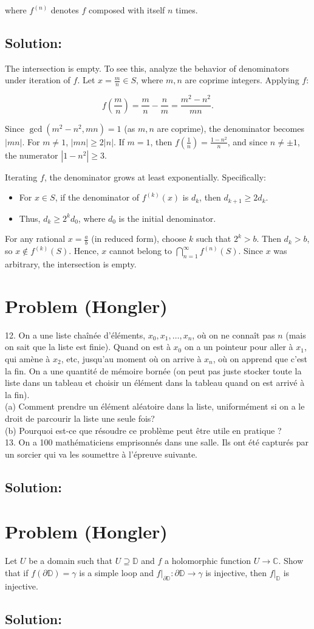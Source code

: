 \documentclass[11pt, a4paper, oneside]{article}
\newcommand{\problem}[1][]{\section{#1} \hfill \par}
\newcommand{\solution}[1][]{\subsection*{#1}\hfill \par}
\theoremstyle{remark}
\theoremstyle{lemma}
\begin{document}
where \( f^{(n)} \) denotes \( f \) composed with itself \( n \) times.
\solution[Solution:] 
The intersection is empty. To see this, analyze the behavior of denominators under iteration of \( f \). Let \( x = \frac{m}{n} \in S \), where \( m, n \) are coprime integers. Applying \( f \):

\[
f\left(\frac{m}{n}\right) = \frac{m}{n} - \frac{n}{m} = \frac{m^2 - n^2}{mn}.
\]

Since \( \gcd(m^2 - n^2, mn) = 1 \) (as \( m, n \) are coprime), the denominator becomes \( |mn| \). For \( m \neq 1 \), \( |mn| \geq 2|n| \). If \( m = 1 \), then \( f\left(\frac{1}{n}\right) = \frac{1 - n^2}{n} \), and since \( n \neq \pm 1 \), the numerator \( |1 - n^2| \geq 3 \). 

Iterating \( f \), the denominator grows at least exponentially. Specifically:
\begin{itemize}
    \item For \( x \in S \), if the denominator of \( f^{(k)}(x) \) is \( d_k \), then \( d_{k+1} \geq 2d_k \).
    \item Thus, \( d_k \geq 2^k d_0 \), where \( d_0 \) is the initial denominator.
\end{itemize}

For any rational \( x = \frac{a}{b} \) (in reduced form), choose \( k \) such that \( 2^k > b \). Then \( d_k > b \), so \( x \notin f^{(k)}(S) \). Hence, \( x \) cannot belong to \( \bigcap_{n=1}^{\infty} f^{(n)}(S) \). Since \( x \) was arbitrary, the intersection is empty.

\newpage
\problem[Problem (Hongler)]
12. On a une liste chaînée d'éléments, $x_{0}, x_{1}, \ldots, x_{n}$, où on ne connaît pas $n$ (mais on sait que la liste est finie). Quand on est à $x_{0}$ on a un pointeur pour aller à $x_{1}$, qui amène à $x_{2}$, etc, jusqu'au moment où on arrive à $x_{n}$, où on apprend que c'est la fin. On a une quantité de mémoire bornée (on peut pas juste stocker toute la liste dans un tableau et choisir un élément dans la tableau quand on est arrivé à la fin).\\
(a) Comment prendre un élément aléatoire dans la liste, uniformément si on a le droit de parcourir la liste une seule fois?\\
(b) Pourquoi est-ce que résoudre ce problème peut être utile en pratique ?\\
13. On a 100 mathématiciens emprisonnés dans une salle. Ils ont été capturés par un sorcier qui va les soumettre à l'épreuve suivante.
\solution[Solution:]

\newpage
\problem[Problem (Hongler)]
 Let \( U \) be a domain such that \( U \supseteq \mathbb{D} \) and \( f \) a holomorphic function \( U \to \mathbb{C} \). Show that if \( f(\partial \mathbb{D}) = \gamma \) is a simple loop and \( f|_{\partial \mathbb{D}} : \partial \mathbb{D} \to \gamma \) is injective, then \( f|_{\mathbb{D}} \) is injective. 

\solution[Solution:]
\end{document}
